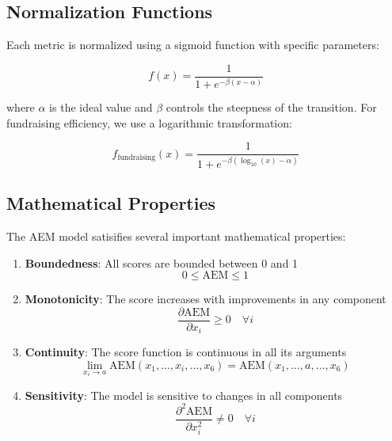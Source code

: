 \documentclass[12pt]{article}
\begin{document}
\subsection{Normalization Functions}

Each metric is normalized using a sigmoid function with specific parameters:

\begin{equation}
    f(x) = \frac{1}{1 + e^{-\beta(x - \alpha)}}
\end{equation}

where $\alpha$ is the ideal value and $\beta$ controls the steepness of the transition. For fundraising efficiency, we use a logarithmic transformation:

\begin{equation}
    f_{\text{fundraising}}(x) = \frac{1}{1 + e^{-\beta(\log_{10}(x) - \alpha)}}
\end{equation}

\subsection{Mathematical Properties}

The AEM model satisifies several important mathematical properties:

\begin{enumerate}
    \item \textbf{Boundedness}: All scores are bounded between 0 and 1
    \begin{equation}
        0 \leq \text{AEM} \leq 1
    \end{equation}
    
    \item \textbf{Monotonicity}: The score increases with improvements in any component
    \begin{equation}
        \frac{\partial \text{AEM}}{\partial x_i} \geq 0 \quad \forall i
    \end{equation}
    
    \item \textbf{Continuity}: The score function is continuous in all its arguments
    \begin{equation}
        \lim_{x_i \to a} \text{AEM}(x_1, \ldots, x_i, \ldots, x_6) = \text{AEM}(x_1, \ldots, a, \ldots, x_6)
    \end{equation}
    
    \item \textbf{Sensitivity}: The model is sensitive to changes in all components
    \begin{equation}
        \frac{\partial^2 \text{AEM}}{\partial x_i^2} \neq 0 \quad \forall i
    \end{equation}
\end{enumerate}
\end{document}
